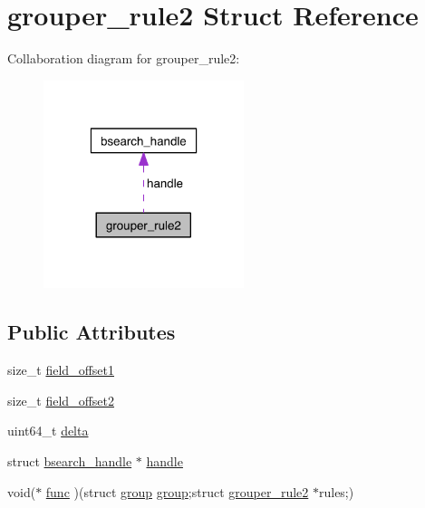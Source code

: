 \hypertarget{structgrouper__rule2}{\section{grouper\-\_\-rule2 \-Struct \-Reference}
\label{structgrouper__rule2}
}


\-Collaboration diagram for grouper\-\_\-rule2\-:
\nopagebreak
\begin{figure}[H]
\begin{center}
\leavevmode
\includegraphics[width=166pt]{structgrouper__rule2__coll__graph}
\end{center}
\end{figure}
\subsection*{\-Public \-Attributes}
\begin{DoxyCompactItemize}
\item 
size\-\_\-t \hyperlink{structgrouper__rule2_a154036e34c1a214dac9922443a3cb490}{field\-\_\-offset1}
\item 
size\-\_\-t \hyperlink{structgrouper__rule2_abb8b051b08d21287edeae8010b94c2ff}{field\-\_\-offset2}
\item 
uint64\-\_\-t \hyperlink{structgrouper__rule2_a5d3e8bac70fa71af6a4d2e09508fd8fe}{delta}
\item 
struct \hyperlink{structbsearch__handle}{bsearch\-\_\-handle} $\ast$ \hyperlink{structgrouper__rule2_a89c0c04ef24df4be1b4c3716eec45a19}{handle}
\item 
void($\ast$ \hyperlink{structgrouper__rule2_a1fbace28813b22c9d2437c5c380e0c8a}{func} )(struct \hyperlink{structgroup}{group} \hyperlink{structgroup}{group};struct \hyperlink{structgrouper__rule2}{grouper\-\_\-rule2} $\ast$rules;)
\end{DoxyCompactItemize}


